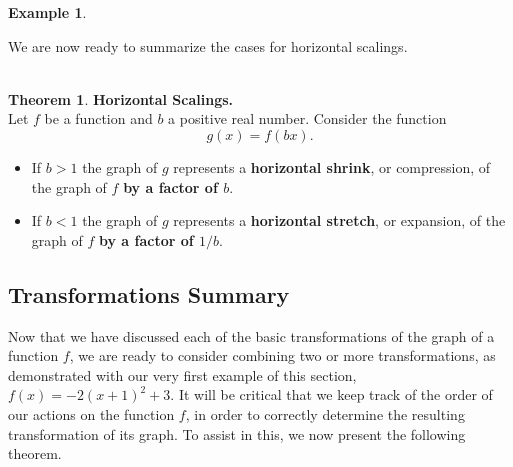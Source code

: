 \documentclass[11pt]{book}
\theoremstyle{definition}  %
\newtheorem{thm}{Theorem}[chapter] %
\newtheorem{example}{Example}[chapter]
\newcommand{\bbm}{\begin{boxedminipage}{4.80in}} %
\newcommand{\ebm}{\end{boxedminipage}}
\begin{document}
\begin{example}
\begin{center}
\end{center}
\end{example}

\smallskip
\newpage
We are now ready to summarize the cases for horizontal scalings.\\
~\\
\bbm
\begin{thm} \label{hscalings}\textbf{Horizontal Scalings.}\\
Let $f$ be a function and $b$ a positive real number.  Consider the function
$$g(x)=f(bx).$$
\begin{itemize}
\item If $b > 1$ the graph of $g$ represents a \textbf{horizontal shrink}, or compression, of the graph of $f$ \textbf{by a factor of $b$}.
\item If $b < 1$ the graph of $g$ represents a \textbf{horizontal stretch}, or expansion, of the graph of $f$ \textbf{by a factor of $1/b$}. 
\end{itemize}
\end{thm}
\ebm
\newpage

\subsection{Transformations Summary}
Now that we have discussed each of the basic transformations of the graph of a function $f$, we are ready to consider combining two or more transformations, as demonstrated with our very first example of this section, $f(x)=-2(x+1)^2+3$.  It will be critical that we keep track of the order of our actions on the function $f$, in order to correctly determine the resulting transformation of its graph.  To assist in this, we now present the following theorem.\\
\end{document}
